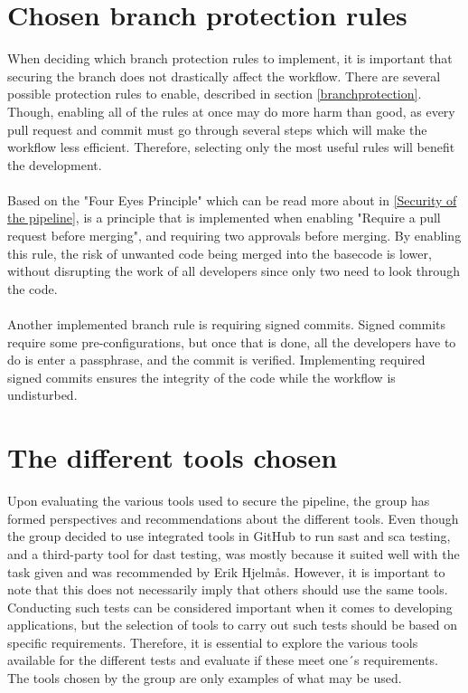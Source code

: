 \section{Chosen branch protection rules}
When deciding which branch protection rules to implement, it is important that securing the branch does not drastically affect the workflow. There are several possible protection rules to enable, described in section \ref{branchprotection}. Though, enabling all of the rules at once may do more harm than good, as every pull request and commit must go through several steps which will make the workflow less efficient. Therefore, selecting only the most useful rules will benefit the development. 
\\~\\
Based on the "Four Eyes Principle" which can be read more about in \ref{Security of the pipeline}, is a principle that is implemented when enabling "Require a pull request before merging", and requiring two approvals before merging. By enabling this rule, the risk of unwanted code being merged into the basecode is lower, without disrupting the work of all developers since only two need to look through the code. \cite{foureyes} 
\\~\\
Another implemented branch rule is requiring signed commits. Signed commits require some pre-configurations, but once that is done, all the developers have to do is enter a passphrase, and the commit is verified. Implementing required signed commits ensures the integrity of the code while the workflow is undisturbed.




\section{The different tools chosen}
Upon evaluating the various tools used to secure the pipeline, the group has formed perspectives and recommendations about the different tools. Even though the group decided to use integrated tools in GitHub to run \acrfull{sast} and \acrshort{sca} testing, and a third-party tool for \acrshort{dast} testing, was mostly because it suited well with the task given and was recommended by Erik Hjelmås. However, it is important to note that this does not necessarily imply that others should use the same tools. Conducting such tests can be considered important when it comes to developing applications, but the selection of tools to carry out such tests should be based on specific requirements. Therefore, it is essential to explore the various tools available for the different tests and evaluate if these meet one´s requirements. The tools chosen by the group are only examples of what may be used. 

